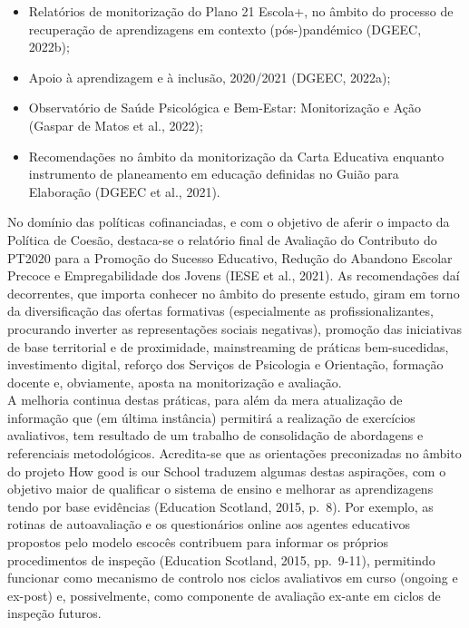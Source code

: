 \documentclass[
]{book}
\providecommand{\tightlist}{%
  \setlength{\itemsep}{0pt}\setlength{\parskip}{0pt}}
\theoremstyle{definition}
\theoremstyle{definition}
\theoremstyle{definition}
\theoremstyle{definition}
\theoremstyle{remark}
\begin{document}
\begin{itemize}
\tightlist
\item
  Relatórios de monitorização do Plano 21 Escola+, no âmbito do processo de recuperação de aprendizagens em contexto (pós-)pandémico (DGEEC, 2022b);
\item
  Apoio à aprendizagem e à inclusão, 2020/2021 (DGEEC, 2022a);
\item
  Observatório de Saúde Psicológica e Bem-Estar: Monitorização e Ação (Gaspar de Matos et al., 2022);
\item
  Recomendações no âmbito da monitorização da Carta Educativa enquanto instrumento de planeamento em educação definidas no Guião para Elaboração (DGEEC et al., 2021).
\end{itemize}

No domínio das políticas cofinanciadas, e com o objetivo de aferir o impacto da Política de Coesão, destaca-se o relatório final de Avaliação do Contributo do PT2020 para a Promoção do Sucesso Educativo, Redução do Abandono Escolar Precoce e Empregabilidade dos Jovens (IESE et al., 2021). As recomendações daí decorrentes, que importa conhecer no âmbito do presente estudo, giram em torno da diversificação das ofertas formativas (especialmente as profissionalizantes, procurando inverter as representações sociais negativas), promoção das iniciativas de base territorial e de proximidade, mainstreaming de práticas bem-sucedidas, investimento digital, reforço dos Serviços de Psicologia e Orientação, formação docente e, obviamente, aposta na monitorização e avaliação.\\
A melhoria continua destas práticas, para além da mera atualização de informação que (em última instância) permitirá a realização de exercícios avaliativos, tem resultado de um trabalho de consolidação de abordagens e referenciais metodológicos. Acredita-se que as orientações preconizadas no âmbito do projeto How good is our School traduzem algumas destas aspirações, com o objetivo maior de qualificar o sistema de ensino e melhorar as aprendizagens tendo por base evidências (Education Scotland, 2015, p.~8). Por exemplo, as rotinas de autoavaliação e os questionários online aos agentes educativos propostos pelo modelo escocês contribuem para informar os próprios procedimentos de inspeção (Education Scotland, 2015, pp.~9-11), permitindo funcionar como mecanismo de controlo nos ciclos avaliativos em curso (ongoing e ex-post) e, possivelmente, como componente de avaliação ex-ante em ciclos de inspeção futuros.
\end{document}
